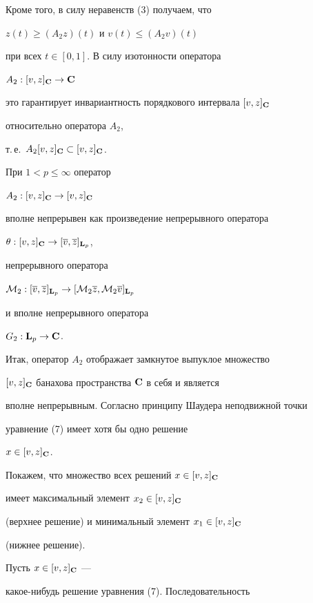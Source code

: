 \begin{pf}
Кроме того, в силу неравенств (3) получаем, что


$z(t)\ge(A_2z)(t)$ и $v(t)\le(A_2v)(t)$


при всех $t\in[0,1]$. В силу изотонности оператора


$A_2:[v,z]_{\bold C}\to\bold C$


это гарантирует инвариантность порядкового интервала $[v,z]_{\bold C}$


относительно оператора $A_2$,


т.\,е.~$ A_2[v,z]_{\bold C}\subset [v,z]_{\bold C}$.


При $1<p\le\infty$ оператор


$A_2:[v,z]_{\bold C}\to [v,z]_{\bold C}$


вполне непрерывен как произведение непрерывного оператора


$\theta:[v,z]_{\bold C}\to [\overline {v},\overline {z}]_{\bold L_p}$,


непрерывного оператора


${\cal M}_2:[\overline {v},\overline {z}]_{\bold L_p}\to


[{\cal M}_2\overline {z},{\cal M}_2\overline {v}]_{\bold L_p}$


и вполне непрерывного оператора


$G_2:\bold L_p\to\bold C$.





Итак, оператор $A_2$ отображает замкнутое выпуклое множество


$[v,z]_{\bold C}$ банахова пространства $\bold C$ в себя и является


вполне непрерывным. Согласно принципу Шаудера неподвижной точки


уравнение (7) имеет хотя бы одно решение


$x\in [v,z]_{\bold C}$.





Покажем, что множество всех решений $x\in [v,z]_{\bold C}$


имеет максимальный элемент $x_2\in [v,z]_{\bold C}$


(верхнее решение) и минимальный элемент $x_1\in [v,z]_{\bold C}$


(нижнее решение).





Пусть $x\in [v,z]_{\bold C}$ ---


какое-нибудь решение уравнения (7). Последовательность



\end{pf}

